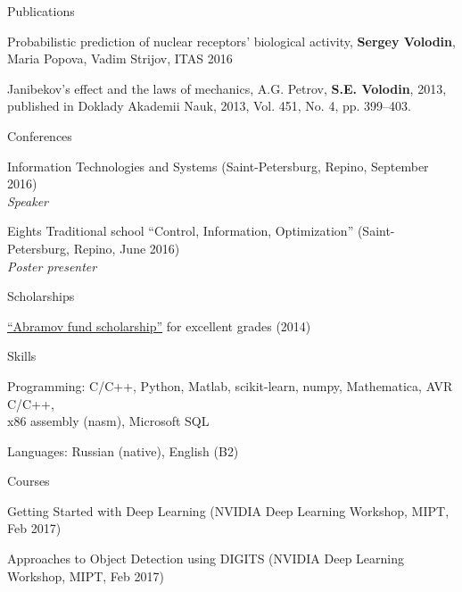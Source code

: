 \documentclass{resume} %
\begin{document}
\begin{rSection}{Publications}
\item Probabilistic prediction of nuclear receptors’ biological activity, {\bf Sergey Volodin}, Maria Popova, Vadim Strijov, ITAS 2016
\item Janibekov’s effect and the laws of mechanics, A.G. Petrov, {\bf S.E. Volodin}, 2013, published in Doklady Akademii Nauk, 2013, Vol. 451, No. 4, pp. 399–403.
\end{rSection}

\newpage

\begin{rSection}{Conferences}
\item Information Technologies and Systems (Saint-Petersburg, Repino, September 2016)\\
{\em Speaker}
\item Eights Traditional school “Control, Information, Optimization” (Saint-Petersburg, Repino, June 2016)\\
{\em Poster presenter}
\end{rSection}

\begin{rSection}{Scholarships}
\item \href{http://phystech-foundation.org/}{``Abramov fund scholarship''} for excellent grades (2014)
\end{rSection}

\begin{rSection}{Skills}
\item Programming: C/C++, Python, Matlab, scikit-learn, numpy, Mathematica, AVR C/C++,\\ x86 assembly (nasm), Microsoft SQL
\item Languages: Russian (native), English (B2)
\end{rSection}

\begin{rSection}{Courses}
	\item Getting Started with Deep Learning (NVIDIA Deep Learning Workshop, MIPT, Feb 2017)
	\item Approaches to Object Detection using DIGITS (NVIDIA Deep Learning Workshop, MIPT, Feb 2017)
\end{rSection}
\end{document}
